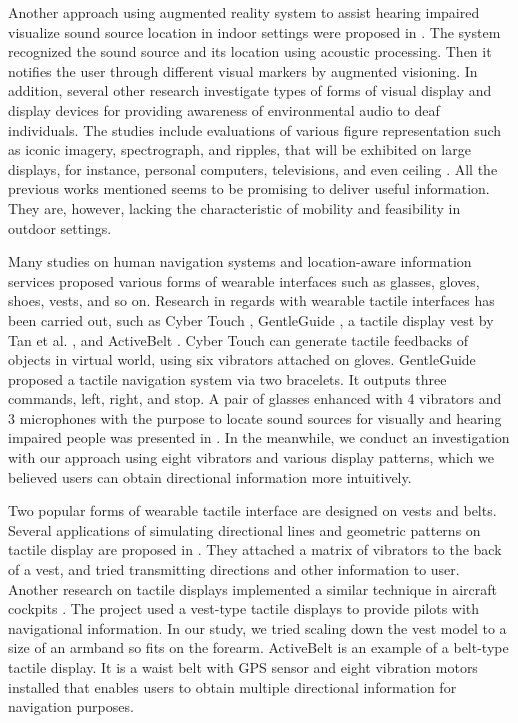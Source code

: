 \documentclass{sigchi}
\begin{document}
Another approach using augmented reality system to assist hearing impaired visualize sound source location in indoor settings were proposed in \cite{Shen2012}. The system recognized the sound source and its location using acoustic processing. Then it notifies the user through different visual markers by augmented visioning. In addition, several other research investigate types of forms of visual display and display devices for providing awareness of environmental audio to deaf individuals. The studies include evaluations of various figure representation such as iconic imagery, spectrograph, and ripples, that will be exhibited on large displays, for instance, personal computers, televisions, and even ceiling \cite{Ho-Ching2003,Matthews2006a,Matthews2005,Tomitsch2007}. All the previous works mentioned seems to be promising to deliver useful information. They are, however, lacking the characteristic of mobility and feasibility in outdoor settings.

Many studies on human navigation systems and location-aware information services proposed various forms of wearable interfaces such as glasses, gloves, shoes, vests, and so on. Research in regards with wearable tactile interfaces has been carried out, such as Cyber Touch \cite{CyberGlove}, GentleGuide \cite{Bosman2003}, a tactile display vest by Tan et al. \cite{Tan1997}, and ActiveBelt \cite{Tsukada2004}. Cyber Touch can generate tactile feedbacks of objects in virtual world, using six vibrators attached on gloves. GentleGuide proposed a tactile navigation system via two bracelets. It outputs three commands, left, right, and stop. A pair of glasses enhanced with 4 vibrators and 3 microphones with the purpose to locate sound sources for visually and hearing impaired people was presented in \cite{Borg}. In the meanwhile, we conduct an investigation with our approach using eight vibrators and various display patterns, which we believed users can obtain directional information more intuitively.
 
Two popular forms of wearable tactile interface are designed on vests and belts. Several applications of simulating directional lines and geometric patterns on tactile display are proposed in \cite{Tan1997}. They attached a matrix of vibrators to the back of a vest, and tried transmitting directions and other information to user. Another research on tactile displays implemented a similar technique in aircraft cockpits \cite{Raj2000}. The project used a vest-type tactile displays to provide pilots with navigational information. In our study, we tried scaling down the vest model to a size of an armband so fits on the forearm. ActiveBelt is an example of a belt-type tactile display. It is a waist belt with GPS sensor and eight vibration motors installed that enables users to obtain multiple directional information for navigation purposes.
\end{document}
